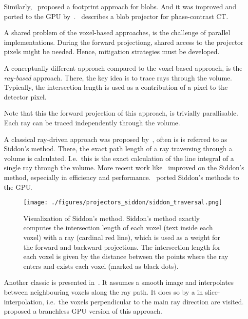 Similarly,~\cite{ziegler_efficient_2006} proposed a footprint approach for blobs. And it was
improved and ported to the \gls{GPU} by~\cite{bippus_projector_2011}.~\cite{kohler_iterative_2011}
describes a blob projector for phase-contrast CT\@.

A shared problem of the voxel-based approaches, is the challenge of parallel implementations. During
the forward projectiong, shared access to the projector pixels might be needed. Hence, mitigation
strategies must be developed.

A conceptually different approach compared to the voxel-based approach, is the \textit{ray-based}
approach. There, the key idea is to trace rays through the volume. Typically, the intersection
length is used as a contribution of a pixel to the detector pixel.

Note that this the forward projection of this approach, is trivially parallisable. Each ray can be
traced independently through the volume.

A classical ray-driven approach was proposed by~\cite{siddon_fast_1985}, often is is referred to as
Siddon's method. There, the exact path length of a ray traversing through a volume is calculated.
I.e.\, this is the exact calculation of the line integral of a single ray through the volume. More
recent work like~\cite{jacobs_fast_1998, christiaens_fast_1999, zhao_fast_2004, gao_fast_2012}
improved on the Siddon's method, especially in efficiency and
performance.~\cite{de_greef_accelerated_2009, xiao_efficient_2012} ported Siddon's methods to the
\gls{GPU}\@.

\begin{figure}[H]
	\centering
	\texttt{[image: ./figures/projectors\_siddon/siddon\_traversal.png]}
	\caption{Visualization of Siddon's method. Siddon's method exactly computes the intersection
		length of each voxel (text inside each voxel) with a ray (cardinal red line), which
		is used as a weight for the forward and backward projections. The intersection
		length for each voxel is given by the distance between the points where the ray
		enters and exists each voxel (marked as black
		dots).}\label{fig:visualization_siddon_traversal}
\end{figure}

Another classic is presented in~\cite{joseph_improved_1982}. It assumes a smooth image and
interpolates between neighbouring voxels along the ray path. It does so by a in slice-interpolation,
i.e.\ the voxels perpendicular to the main ray direction are visited.~\cite{graetz_high_2020}
proposed a branchless \gls{GPU} version of this approach.

